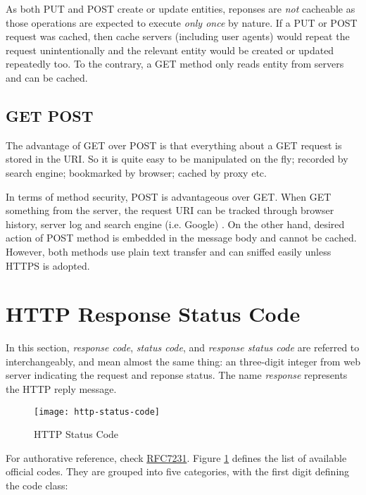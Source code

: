 As both PUT and POST create or update entities, reponses are
\textit{not} cacheable as those operations are expected to execute
\textit{only once} by nature. If a PUT or POST request was cached,
then cache servers (including user agents) would repeat the
request unintentionally and the relevant entity would be created
or updated repeatedly too. To the contrary, a GET method only
reads entity from servers and can be cached.

\subsection{GET POST}
\label{sec:get-post}

The advantage of GET over POST is that everything about a GET
request is stored in the URI. So it is quite easy to be
manipulated on the fly; recorded by search engine; bookmarked by
browser; cached by proxy etc.

In terms of method security, POST is advantageous over GET. When
GET something from the server, the request URI can be tracked
through browser history, server log and search engine
(i.e. Google) . On the other hand, desired action of POST method
is embedded in the message body and cannot be cached. However,
both methods use plain text transfer and can sniffed easily unless
HTTPS is adopted.

\section{HTTP Response Status Code}
\label{sec:http-response-status-code}

In this section, \textit{response code}, \textit{status code}, and
\textit{response status code} are referred to interchangeably, and
mean almost the same thing: an three-digit integer from web server
indicating the request and reponse status. The name
\textit{response} represents the HTTP reply message.

\begin{figure}[tbp]
  \centering
  \texttt{[image: http-status-code]}
  \caption{HTTP Status Code}
  \label{fig:http-status-code}
\end{figure}

For authorative reference, check
\href{https://tools.ietf.org/html/rfc7231/rfc7231}{RFC7231}. Figure
\ref{fig:http-status-code} defines the list of available official
codes. They are grouped into five categories, with the first digit
defining the code class:

